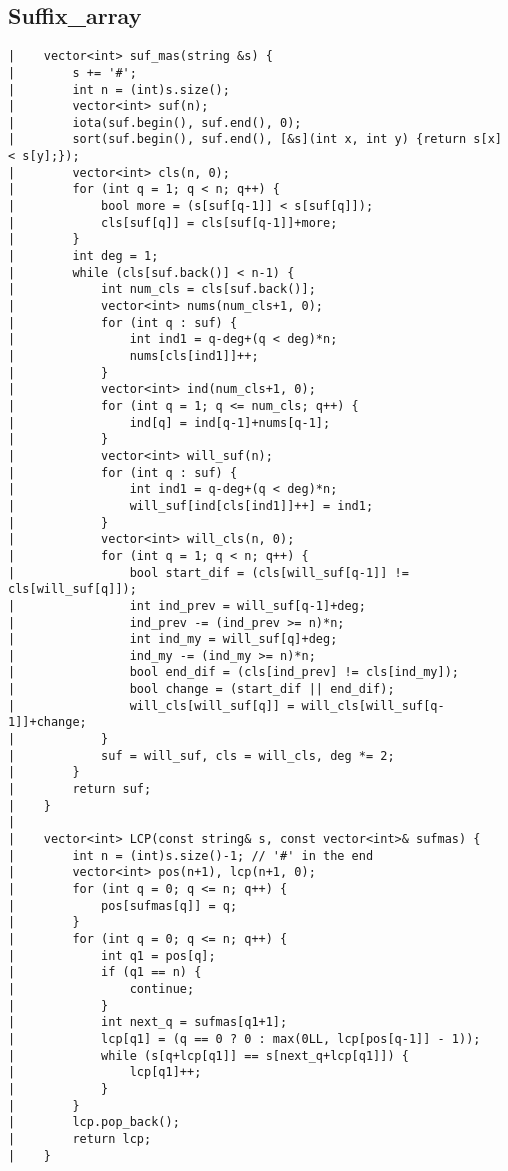 \documentclass[a4paper, 10pt]{article}
\begin{document}
\begin{center}
\section*{Suffix\_array}
\begin{verbatim}
|    vector<int> suf_mas(string &s) {
|        s += '#';
|        int n = (int)s.size();
|        vector<int> suf(n);
|        iota(suf.begin(), suf.end(), 0);
|        sort(suf.begin(), suf.end(), [&s](int x, int y) {return s[x] < s[y];});
|        vector<int> cls(n, 0);
|        for (int q = 1; q < n; q++) {
|            bool more = (s[suf[q-1]] < s[suf[q]]);
|            cls[suf[q]] = cls[suf[q-1]]+more;
|        }
|        int deg = 1;
|        while (cls[suf.back()] < n-1) {
|            int num_cls = cls[suf.back()];
|            vector<int> nums(num_cls+1, 0);
|            for (int q : suf) {
|                int ind1 = q-deg+(q < deg)*n;
|                nums[cls[ind1]]++;
|            }
|            vector<int> ind(num_cls+1, 0);
|            for (int q = 1; q <= num_cls; q++) {
|                ind[q] = ind[q-1]+nums[q-1];
|            }
|            vector<int> will_suf(n);
|            for (int q : suf) {
|                int ind1 = q-deg+(q < deg)*n;
|                will_suf[ind[cls[ind1]]++] = ind1;
|            }
|            vector<int> will_cls(n, 0);
|            for (int q = 1; q < n; q++) {
|                bool start_dif = (cls[will_suf[q-1]] != cls[will_suf[q]]);
|                int ind_prev = will_suf[q-1]+deg;
|                ind_prev -= (ind_prev >= n)*n;
|                int ind_my = will_suf[q]+deg;
|                ind_my -= (ind_my >= n)*n;
|                bool end_dif = (cls[ind_prev] != cls[ind_my]);
|                bool change = (start_dif || end_dif);
|                will_cls[will_suf[q]] = will_cls[will_suf[q-1]]+change;
|            }
|            suf = will_suf, cls = will_cls, deg *= 2;
|        }
|        return suf;
|    }
|    
|    vector<int> LCP(const string& s, const vector<int>& sufmas) {
|        int n = (int)s.size()-1; // '#' in the end
|        vector<int> pos(n+1), lcp(n+1, 0);
|        for (int q = 0; q <= n; q++) {
|            pos[sufmas[q]] = q;
|        }
|        for (int q = 0; q <= n; q++) {
|            int q1 = pos[q];
|            if (q1 == n) {
|                continue;
|            }
|            int next_q = sufmas[q1+1];
|            lcp[q1] = (q == 0 ? 0 : max(0LL, lcp[pos[q-1]] - 1));
|            while (s[q+lcp[q1]] == s[next_q+lcp[q1]]) {
|                lcp[q1]++;
|            }
|        }
|        lcp.pop_back();
|        return lcp;
|    }
\end{verbatim}


\end{center}
\end{document}
